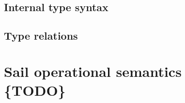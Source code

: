 \documentclass[11pt]{article}
\begin{document}
\subsection{Internal type syntax}

\ottgrammartabular{
\ottk\ottinterrule
\ottt\ottinterrule
\ottoptx\ottinterrule
\otttag\ottinterrule
\ottne\ottinterrule
\otttXXarg\ottinterrule
\otttXXargs\ottinterrule
\ottnec\ottinterrule
\ottSXXN\ottinterrule
\ottEXXd\ottinterrule
\ottkinf\ottinterrule
\otttid\ottinterrule
\ottEXXk\ottinterrule
\otttinf\ottinterrule
\ottEXXa\ottinterrule
\ottfieldXXtyps\ottinterrule
\ottEXXr\ottinterrule
\ottenumerateXXmap\ottinterrule
\ottEXXe\ottinterrule
\ottEXXt\ottinterrule
\ottts\ottinterrule
\ottE\ottinterrule
\ottI\ottinterrule
\ottformula\ottinterrule}


\subsection{ Type relations }
\ottdefnss

\section{Sail operational semantics \{TODO\}}
\end{document}
